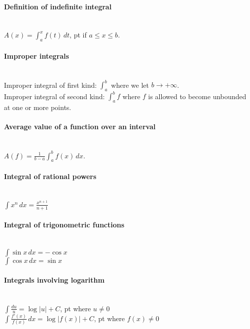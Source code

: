 \documentclass[10pt]{article}
\begin{document}
\paragraph{Definition of indefinite integral}\ \\
$A(x) = \int_a^x f(t)\,dt$,  pt if $a \leq x \leq b$.

\paragraph{Improper integrals}\ \\
Improper integral of first kind: $\int_a^b$ where we let $b \to +\infty$.\\
Improper integral of second kind: $\int_a^b f$ where $f$ is allowed to become unbounded at one or more points.

\paragraph{Average value of a function over an interval}\ \\
$A(f) = \frac{1}{b-a} \int_a^b f(x)\,dx.$

\paragraph{Integral of rational powers}\ \\
$\int x^n\,dx = \frac{x^{n+1}}{n+1}$

\paragraph{Integral of trigonometric functions}\ \\
$\int \sin x\,dx = -\cos x$\\
$\int \cos x\,dx = \sin x$

\paragraph{Integrals involving logarithm}\ \\
$\int \frac{du}{u} = \log |u| + C$,  pt where $u \neq 0$\\
$\int \frac{f'(x)}{f(x)}\,dx = \log |f(x)| + C$,  pt where $f(x) \neq 0$
\end{document}
